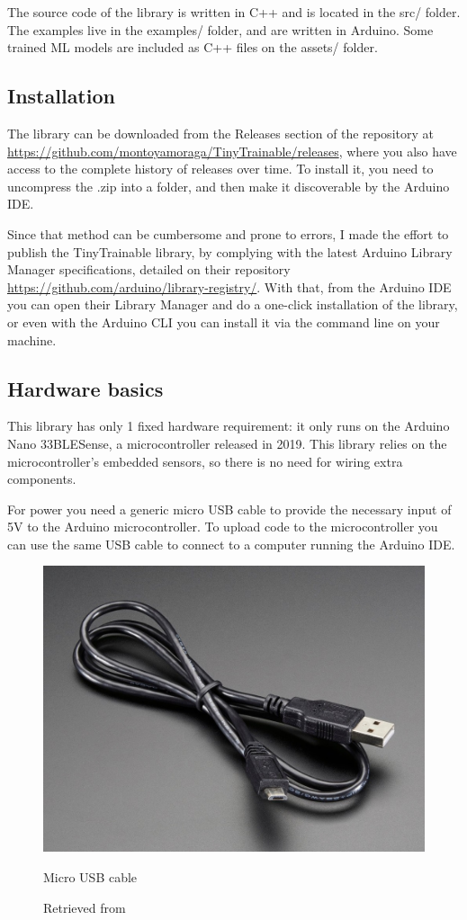 The source code of the library is written in C++ and is located in the src/ folder. The examples live in the examples/ folder, and are written in Arduino. Some trained \acrshort{ML} models are included as C++ files on the assets/ folder.

\subsection{Installation}

The library can be downloaded from the Releases section of the repository at  \url{https://github.com/montoyamoraga/TinyTrainable/releases}, where you also have access to the complete history of releases over time. To install it, you need to uncompress the .zip into a folder, and then make it discoverable by the Arduino IDE.

Since that method can be cumbersome and prone to errors, I made the effort to publish the TinyTrainable library, by complying with the latest Arduino Library Manager specifications, detailed on their repository \url{https://github.com/arduino/library-registry/}. With that, from the Arduino IDE you can open their Library Manager and do a one-click installation of the library, or even with the Arduino CLI you can install it via the command line on your machine.

\subsection{Hardware basics}

This library has only 1 fixed hardware requirement: it only runs on the Arduino Nano 33\acrshort{BLE}Sense, a microcontroller released in 2019. This library relies on the microcontroller's embedded sensors, so there is no need for wiring extra components.

For power you need a generic micro USB cable to provide the necessary input of 5V to the Arduino microcontroller. To upload code to the microcontroller you can use the same USB cable to connect to a computer running the Arduino IDE.

\begin{figure}[ht]
  \centering
  \includegraphics[width=0.75\linewidth,height=0.25\textheight,keepaspectratio]{images/materials-adafruit-micro-usb-cable.jpg}
  \caption{Micro USB cable}
  \caption*{Retrieved from \cite{website-materials-adafruit-micro-usb-cable}}
  \label{fig:materials-adafruit-usb-cable}
\end{figure}

